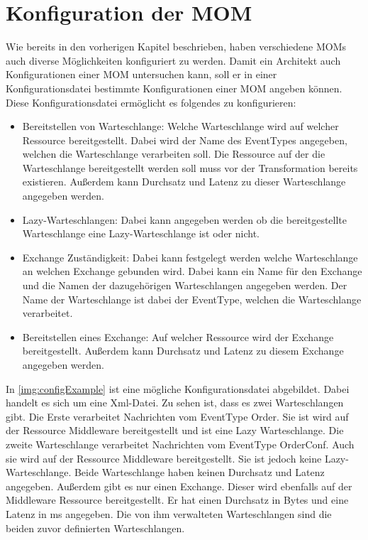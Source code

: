 \section{Konfiguration der MOM}
Wie bereits in den vorherigen Kapitel beschrieben, haben verschiedene MOMs auch diverse Möglichkeiten konfiguriert zu werden. Damit ein Architekt auch Konfigurationen einer MOM untersuchen kann, soll er in einer Konfigurationsdatei bestimmte Konfigurationen einer MOM angeben können. Diese Konfigurationsdatei ermöglicht es folgendes zu konfigurieren:
\begin{itemize}
    \item Bereitstellen von Warteschlange: Welche Warteschlange wird auf welcher Ressource bereitgestellt. Dabei wird der Name des EventTypes angegeben, welchen die Warteschlange verarbeiten soll. Die Ressource auf der die Warteschlange bereitgestellt werden soll muss vor der Transformation bereits existieren. Außerdem kann Durchsatz und Latenz zu dieser Warteschlange angegeben werden.
    \item Lazy-Warteschlangen: Dabei kann angegeben werden ob die bereitgestellte Warteschlange eine Lazy-Warteschlange ist oder nicht. 
    \item Exchange Zuständigkeit: Dabei kann festgelegt werden welche Warteschlange an welchen Exchange gebunden wird. Dabei kann ein Name für den Exchange und die Namen der dazugehörigen Warteschlangen angegeben werden. Der Name der Warteschlange ist dabei der EventType, welchen die Warteschlange verarbeitet.
    \item Bereitstellen eines Exchange: Auf welcher Ressource wird der Exchange bereitgestellt. Außerdem kann Durchsatz und Latenz zu diesem Exchange angegeben werden.
\end{itemize}
In \autoref{img:configExample} ist eine mögliche Konfigurationsdatei abgebildet. Dabei handelt es sich um eine Xml-Datei. Zu sehen ist, dass es zwei Warteschlangen gibt. Die Erste verarbeitet Nachrichten vom EventType Order. Sie ist wird auf der Ressource Middleware bereitgestellt und ist eine Lazy Warteschlange. Die zweite Warteschlange verarbeitet Nachrichten vom EventType OrderConf. Auch sie wird auf der Ressource Middleware bereitgestellt. Sie ist jedoch keine Lazy-Warteschlange. Beide Warteschlange haben keinen Durchsatz und Latenz angegeben. Außerdem gibt es nur einen Exchange. Dieser wird ebenfalls auf der Middleware Ressource bereitgestellt. Er hat einen Durchsatz in Bytes und eine Latenz in ms angegeben. Die von ihm verwalteten Warteschlangen sind die beiden zuvor definierten Warteschlangen.

